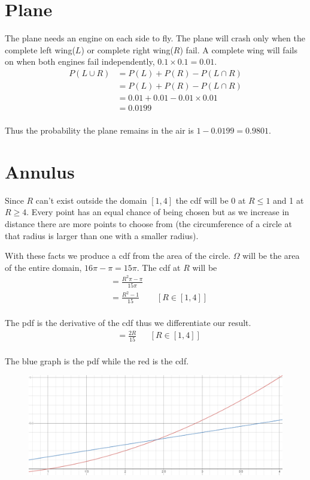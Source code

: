 \documentclass{article}
\begin{document}
\section{Plane}
The plane needs an engine on each side to fly. The plane will crash only when
the complete left wing($L$) or complete right wing($R$) fail. A complete wing
will fails on when both engines fail independently, $0.1 \times 0.1 = 0.01$.
\begin{align*}
    P(L \cup R) &= P(L) + P(R) - P(L \cap R) \\
    &= P(L) + P(R) - P(L \cap R) \\
    &= 0.01 + 0.01 - 0.01 \times 0.01 \\
    &= 0.0199 \\
\end{align*}

Thus the probability the plane remains in the air is $1-0.0199 = 0.9801$.

\section{Annulus}
Since $R$ can't exist outside the domain $[1,4]$ the cdf will be 0 at
$R \leq 1$ and 1 at $R \geq 4$. Every point has an equal chance of being
chosen but as we increase in distance there are more points to choose from
(the circumference of a circle at that radius is larger than one with a
smaller radius).

With these facts we produce a cdf from the area of the circle. $\Omega$ will
be the area of the entire domain, $16\pi - \pi = 15\pi$. The cdf at $R$ will be
\begin{align*}
    &= \frac{R^2\pi - \pi}{15\pi} \\
    &= \frac{R^2 - 1}{15} && [R \in [1,4]]\\
\end{align*}

The pdf is the derivative of the cdf thus we differentiate our result.
\begin{align*}
    &= \frac{2R}{15} && [R \in [1,4]] \\
\end{align*}

The blue graph is the pdf while the red is the cdf.
\begin{figure}[H]
    \centering
    \includegraphics[width=5in]{cdf.png}
\end{figure}
\end{document}
